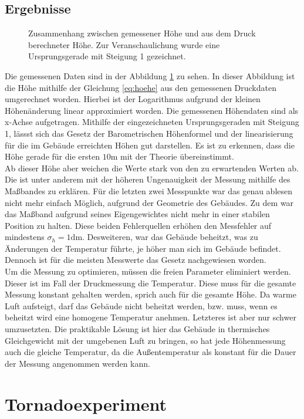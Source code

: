 \documentclass[12pt,a4paper,titlepage,headinclude]{scrartcl}
\numberwithin{equation}{subsection}
\begin{document}
\subsection{Ergebnisse}
\begin{figure}[!h]
\centering

\caption{Zusammenhang zwischen gemessener Höhe und aus dem Druck berechneter Höhe. Zur Veranschaulichung wurde eine Ursprungsgerade mit Steigung 1 gezeichnet.}
\label{fig:hoehe}
\end{figure}
Die gemessenen Daten sind in der Abbildung \ref{fig:hoehe} zu sehen.
In dieser Abbildung ist die Höhe mithilfe der Gleichung \eqref{eq:hoehe} aus den gemessenen Druckdaten umgerechnet worden.
Hierbei ist der Logarithmus aufgrund der kleinen Höhenänderung linear approximiert worden.
Die gemessenen Höhendaten sind als x-Achse aufgetragen.
Mithilfe der eingezeichneten Ursprungsgeraden mit Steigung 1, lässst sich das Gesetz der Barometrischen Höhenformel und der linearisierung für die im Gebäude erreichten Höhen gut darstellen.
Es ist zu erkennen, dass die Höhe gerade für die ersten $10\si{\meter}$ mit der Theorie übereinstimmt.\\
Ab dieser Höhe aber weichen die Werte stark von den zu erwartenden Werten ab.
Die ist unter anderem mit der höheren Ungenauigkeit der Messung mithilfe des Maßbandes zu erklären.
Für die letzten zwei Messpunkte war das genau ablesen nicht mehr einfach Möglich, aufgrund der Geometrie des Gebäudes.
Zu dem war das Maßband aufgrund seines Eigengewichtes nicht mehr in einer stabilen Position zu halten.
Diese beiden Fehlerquellen erhöhen den Messfehler auf mindestens $\sigma_h=1\si{\deci\meter}$.
Desweiteren, war das Gebäude beheitzt, was zu Änderungen der Temperatur führte, je höher man sich im Gebäude befindet.
Dennoch ist für die meisten Messwerte das Gesetz nachgewiesen worden.\\
Um die Messung zu optimieren, müssen die freien Parameter eliminiert werden.
Dieser ist im Fall der Druckmessung die Temperatur.
Diese muss für die gesamte Messung konstant gehalten werden, sprich auch für die gesamte Höhe.
Da warme Luft aufsteigt, darf das Gebäude nicht beheitzt werden, bzw. muss, wenn es beheitzt wird eine homogene Temperatur anehmen.
Letzteres ist aber nur schwer umzusetzten.
Die praktikable Lösung ist hier das Gebäude in thermisches Gleichgewicht mit der umgebenen Luft zu bringen, so hat jede Höhenmessung auch die gleiche Temperatur, da die Außentemperatur als konstant für die Dauer der Messung angenommen werden kann.

\section{Tornadoexperiment}
\end{document}
